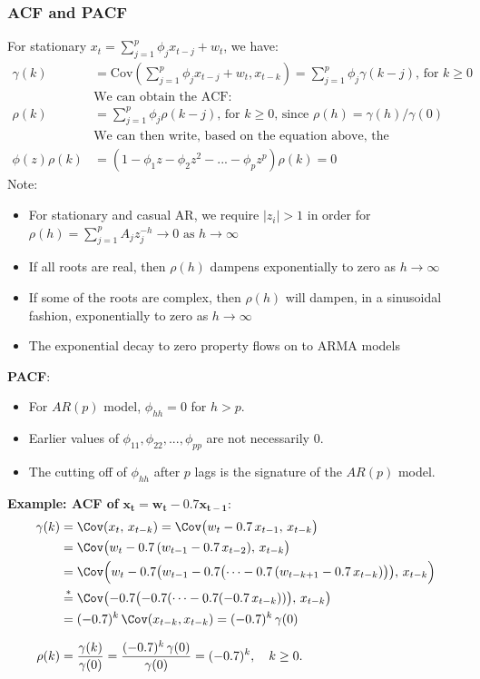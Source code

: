 \documentclass[11pt]{article}
\newcommand{\noi}{\noindent}
\begin{document}
\subsubsection{ACF and PACF}
\noi For stationary $x_t = \sum_{j=1}^p{\phi_jx_{t-j} + w_t}$, we have:
\begin{align*}
    \gamma(k) &= \text{Cov}(\sum_{j=1}^{p}{\phi_jx_{t-j} + w_t, x_{t-k}}) = \sum_{j=1}^{p}\phi_j \gamma(k-j) \text{, for } k \geq 0 \\
    &\text{We can obtain the ACF}: \\
    \rho(k) &= \sum_{j=1}^{p}{\phi_j \rho(k-j)} \text{, for } k \geq 0 \text{, since } \rho(h) = \gamma(h)/\gamma(0) \\
    &\text{We can then write, based on the equation above, the characteristic polynomial} \\
    \phi(z)\rho(k) &= (1-\phi_1z - \phi_2z^2 - ... - \phi_p z^p)\rho(k) = 0
\end{align*} \phantom{i}
\noi Note:
\begin{itemize}
    \item For stationary and casual AR, we require $|z_i| > 1$ in order for $\rho(h) = \sum_{j=1}^p{A_jz_j^{-h}} \rightarrow 0 \text{ as } h \rightarrow \infty$
    \item If all roots are real, then $\rho(h)$ dampens exponentially to zero as $h \rightarrow \infty$
    \item If some of the roots are complex, then $\rho(h)$ will dampen, in a sinusoidal fashion, exponentially to zero as $h \rightarrow \infty$
    \item The exponential decay to zero property flows on to ARMA models
\end{itemize} \phantom{i}

\noi \textbf{PACF}:
\begin{itemize}
    \item For $AR(p)$ model, $\phi_{hh} = 0$ for $h > p$.
    \item Earlier values of $\phi_{11}, \phi_{22},...,\phi_{pp}$ are not necessarily $0$.
    \item The cutting off of $\phi_{hh}$ after $p$ lags is the signature of the $AR(p)$ model.
\end{itemize} \phantom{i}

\noi \textbf{Example: ACF of} $\boldsymbol{x_t = w_t -0.7x_{t-1}}$:
\begin{align*}
\gamma(k)
&= \Cov(x_t,\,x_{t-k})
   = \Cov\bigl(w_t - 0.7\,x_{t-1},\,x_{t-k}\bigr)\\
&= \Cov\bigl(w_t - 0.7\,(w_{t-1} - 0.7\,x_{t-2}),\,x_{t-k}\bigr)\\
&= \Cov\Bigl(w_t - 0.7\bigl(w_{t-1}
       - 0.7\bigl(\dots
       - 0.7\,(w_{t-k+1}-0.7\,x_{t-k})\bigr)\bigr),\,x_{t-k}\Bigr)\\
&\stackrel{*}{=}
   \Cov\bigl(-0.7\bigl(-0.7(\dots-0.7(-0.7\,x_{t-k}))\bigr),\,x_{t-k}\bigr)\\
&= (-0.7)^k\,\Cov(x_{t-k},x_{t-k})
  = (-0.7)^k\,\gamma(0)
\\[6pt]
\rho(k)
&= \frac{\gamma(k)}{\gamma(0)}
  = \frac{(-0.7)^k\,\gamma(0)}{\gamma(0)}
  = (-0.7)^k,\quad k\ge0.
\end{align*}
\end{document}
